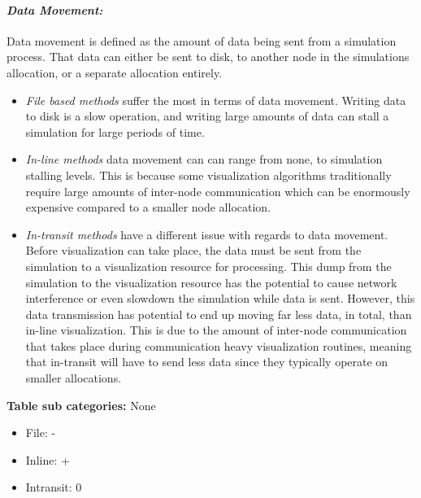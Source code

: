 \paragraph{\emph{Data Movement:}}
Data movement is defined as the amount of data being sent from a simulation process. That data can either be sent to disk, to another node in the simulations allocation, or a separate allocation entirely. 
\begin{itemize}
    \item \emph{File based methods} suffer the most in terms of data movement. Writing data to disk is a slow operation, and writing large amounts of data can stall a simulation for large periods of time. 
    
    \item \emph{In-line methods} data movement can can range from none, to simulation stalling levels. This is because some visualization algorithms traditionally require large amounts of inter-node communication which can be enormously expensive compared to a smaller node allocation. 
    
    \item \emph{In-transit methods} have a different issue with regards to data movement. Before visualization can take place, the data must be sent from the simulation to a visualization resource for processing. This dump from the simulation to the visualization resource has the potential to cause network interference or even slowdown the simulation while data is sent. However, this data transmission has potential to end up moving far less data, in total, than in-line visualization. This is due to the amount of inter-node communication that takes place during communication heavy visualization routines, meaning that in-transit will have to send less data since they typically operate on smaller allocations.
\end{itemize}
\textbf{Table sub categories:} None
\begin{itemize}
    \item File: -
    \item Inline: +
    \item Intransit: 0
\end{itemize}

